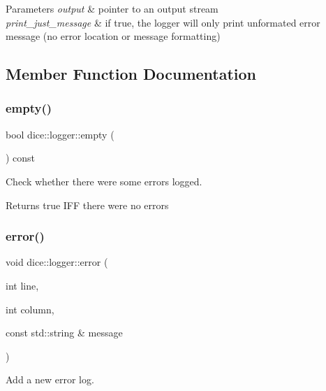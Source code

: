 \begin{DoxyParams}{Parameters}
{\em output} & pointer to an output stream \\
\hline
{\em print\+\_\+just\+\_\+message} & if true, the logger will only print unformated error message (no error location or message formatting) \\
\hline
\end{DoxyParams}


\subsection{Member Function Documentation}
\mbox{\label{classdice_1_1logger_a7323ce67ddcf4d61f33ae000ec0421ac}} 
\subsubsection{\texorpdfstring{empty()}{empty()}}
{\footnotesize\ttfamily bool dice\+::logger\+::empty (\begin{DoxyParamCaption}{ }\end{DoxyParamCaption}) const}



Check whether there were some errors logged. 

\begin{DoxyReturn}{Returns}
true I\+FF there were no errors 
\end{DoxyReturn}
\mbox{\label{classdice_1_1logger_a5fb04ac776c40a57cee18ceb4fbdae9e}} 
\subsubsection{\texorpdfstring{error()}{error()}}
{\footnotesize\ttfamily void dice\+::logger\+::error (\begin{DoxyParamCaption}\item[{int}]{line,  }\item[{int}]{column,  }\item[{const std\+::string \&}]{message }\end{DoxyParamCaption})}



Add a new error log. 


